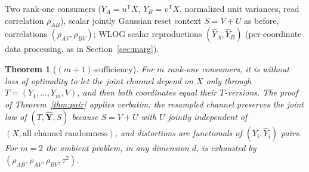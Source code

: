 \documentclass[11pt]{article}
\newtheorem{theorem}{Theorem}\newtheorem{corollary}{Corollary}
\newcommand{\hY}{\widehat Y}
\begin{document}
Two rank-one consumers ($Y_A=u^{\mathsf T}X$, $Y_B=v^{\mathsf T}X$,
normalized unit variances, read correlation $\rho_{AB}$), scalar jointly
Gaussian reset context $S=V+U$ as before, correlations
$(\rho_{AV},\rho_{BV})$; WLOG scalar reproductions
$(\hY_A,\hY_B)$ (per-coordinate data processing, as in
Section~\ref{sec:marg}).

\begin{theorem}[$(m{+}1)$-sufficiency]\label{thm:triple}
For $m$ rank-one consumers, it is without loss of optimality to let the
joint channel depend on $X$ only through
$T=(Y_1,\ldots,Y_m,V)$, and then both coordinates equal their
$T$-versions. The proof of Theorem~\ref{thm:pair} applies verbatim: the
resampled channel preserves the joint law of $(T,\hat{\mathbf Y},S)$ because
$S=V+U$ with $U$ jointly independent of $(X,\text{all channel
randomness})$, and distortions are functionals of $(Y_i,\hY_i)$ pairs.
For $m=2$ the ambient problem, in any dimension $d$, is exhausted by
$(\rho_{AB},\rho_{AV},\rho_{BV},\tau^2)$.
\end{theorem}
\end{document}
